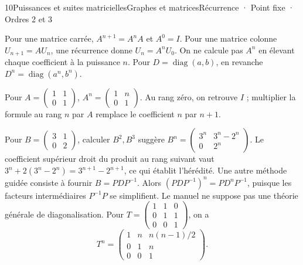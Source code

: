 \begin{ouverture}[suites]{10}{Puissances et suites matricielles}{Graphes et matrices}{Récurrence · Point fixe · Ordres 2 et 3}
\end{ouverture}
\essentiel

Pour une matrice carrée, $A^{n+1}=A^nA$ et $A^0=I$. Pour une matrice colonne $U_{n+1}=AU_n$, une récurrence donne $U_n=A^nU_0$.
On ne calcule pas $A^n$ en élevant chaque coefficient à la puissance $n$.
Pour $D=\operatorname{diag}(a,b)$, en revanche $D^n=\operatorname{diag}(a^n,b^n)$.
\begin{exemple}
Pour $A=\begin{pmatrix}1&1\\0&1\end{pmatrix}$,
$A^n=\begin{pmatrix}1&n\\0&1\end{pmatrix}$.
Au rang zéro, on retrouve $I$ ; multiplier la formule au rang $n$ par $A$ remplace le coefficient $n$ par $n+1$.
\end{exemple}
Pour $B=\begin{pmatrix}3&1\\0&2\end{pmatrix}$, calculer $B^2,B^3$ suggère
$B^n=\begin{pmatrix}3^n&3^n-2^n\\0&2^n\end{pmatrix}$.
Le coefficient supérieur droit du produit au rang suivant vaut $3^n+2(3^n-2^n)=3^{n+1}-2^{n+1}$, ce qui établit l'hérédité.
Une autre méthode guidée consiste à fournir $B=PDP^{-1}$. Alors $(PDP^{-1})^n=PD^nP^{-1}$, puisque les facteurs intermédiaires $P^{-1}P$ se simplifient. Le manuel ne suppose pas une théorie générale de diagonalisation.
Pour $T=\begin{pmatrix}1&1&0\\0&1&1\\0&0&1\end{pmatrix}$, on a
\[T^n=\begin{pmatrix}1&n&n(n-1)/2\\0&1&n\\0&0&1\end{pmatrix}.
\]
